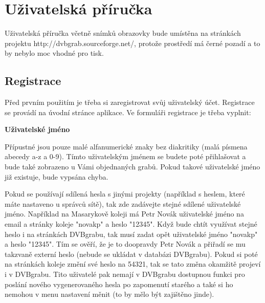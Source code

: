 \chapter{Uživatelská příručka}

Uživatelská příručka včetně snímků obrazovky bude umístěna na stránkách projektu \linebreak[4]http://dvbgrab.sourceforge.net/, protože prostředí má černé pozadí a to by nebylo moc vhodné pro tisk.

\vspace{10pt}

\section{Registrace}

\vspace{10pt}

Před prvním použitím je třeba si zaregistrovat svůj uživatelský účet. Registrace se provádí na úvodní stránce aplikace. Ve formuláři registrace je třeba vyplnit:

\vspace{10pt}

\textbf{Uživatelské jméno}

Přípustné jsou pouze malé alfanumerické znaky bez diakritiky (malá písmena abecedy a-z a 0-9). Tímto uživatelským jménem se budete poté přihlašovat a bude také zobrazeno u Vámi objednaných grabů. Pokud takové uživatelské jméno již existuje, bude vypsána chyba. 

\vspace{10pt}

Pokud se používají sdílená hesla s jinými projekty (například s heslem, které máte nastaveno u správců sítě), tak zde zadávejte stejné sdílené uživatelské jméno. Například na Masarykově koleji má Petr Novák uživatelské jméno na email a stránky koleje "novakp" a heslo "12345". Když bude chtít využívat stejné heslo i na stránkách DVBgrabu, tak musí zadat opět uživatelské jméno "novakp" a heslo "12345". Tím se ověří, že je to doopravdy Petr Novák a přiřadí se mu takzvaně externí heslo (nebude se ukládat v databázi DVBgrabu). Pokud si poté na stránkách koleje změní své heslo na 54321, tak se tato změna okamžitě projeví i v DVBgrabu. Tito uživatelé pak nemají v DVBgrabu dostupnou funkci pro poslání nového vygenerovaného hesla po zapomenutí starého a také si ho nemohou v menu nastavení měnit (to by mělo být zajištěno jinde).

\vspace{10pt}

